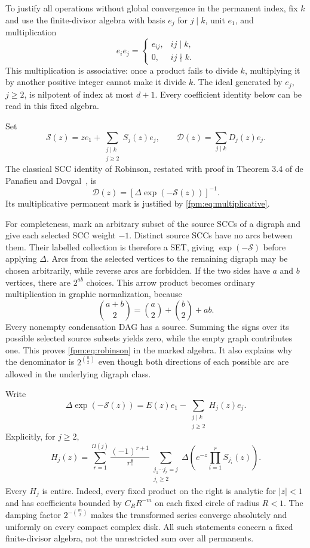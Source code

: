 \documentclass[11pt]{article}
\theoremstyle{definition}\newtheorem{definition}[theorem]{Definition}
\theoremstyle{remark}\newtheorem{remark}[theorem]{Remark}
\begin{document}
To justify all operations without global convergence in the permanent index, fix $k$ and use the finite-divisor algebra with basis $e_j$ for $j\mid k$, unit $e_1$, and multiplication
\[
 e_i e_j=\begin{cases}e_{ij},&ij\mid k,\\0,&ij\nmid k.\end{cases}
\]
This multiplication is associative: once a product fails to divide $k$, multiplying it by another positive integer cannot make it divide $k$. The ideal generated by $e_j$, $j\ge2$, is nilpotent of index at most $d+1$. Every coefficient identity below can be read in this fixed algebra.

Set
\[
 \mathcal S(z)=ze_1+\sum_{\substack{j\mid k\\j\ge2}}S_j(z)e_j,
 \qquad \mathcal D(z)=\sum_{j\mid k}D_j(z)e_j.
\]
The classical SCC identity of Robinson, restated with proof in Theorem 3.4 of de Panafieu and Dovgal~\cite{symbolic}, is
\begin{equation}\label{fpm:eq:robinson}
 \mathcal D(z)=\left[\Delta\exp(-\mathcal S(z))\right]^{-1}.
\end{equation}
Its multiplicative permanent mark is justified by \eqref{fpm:eq:multiplicative}.

For completeness, mark an arbitrary subset of the source SCCs of a digraph and give each selected SCC weight $-1$. Distinct source SCCs have no arcs between them. Their labelled collection is therefore a SET, giving $\exp(-\mathcal S)$ before applying $\Delta$. Arcs from the selected vertices to the remaining digraph may be chosen arbitrarily, while reverse arcs are forbidden. If the two sides have $a$ and $b$ vertices, there are $2^{ab}$ choices. This arrow product becomes ordinary multiplication in graphic normalization, because
\[
 \binom{a+b}{2}=\binom a2+\binom b2+ab.
\]
Every nonempty condensation DAG has a source. Summing the signs over its possible selected source subsets yields zero, while the empty graph contributes one. This proves \eqref{fpm:eq:robinson} in the marked algebra. It also explains why the denominator is $2^{\binom n2}$ even though both directions of each possible arc are allowed in the underlying digraph class.

Write
\begin{equation}\label{fpm:eq:Hdef}
 \Delta\exp(-\mathcal S(z))=E(z)e_1-
 \sum_{\substack{j\mid k\\j\ge2}}H_j(z)e_j.
\end{equation}
Explicitly, for $j\ge2$,
\begin{equation}\label{fpm:eq:Hexplicit}
 H_j(z)=\sum_{r=1}^{\Omega(j)}\frac{(-1)^{r+1}}{r!}
 \sum_{\substack{j_1\cdots j_r=j\\j_i\ge2}}
 \Delta\!\left(e^{-z}\prod_{i=1}^r S_{j_i}(z)\right).
\end{equation}
Every $H_j$ is entire. Indeed, every fixed product on the right is analytic for $|z|<1$ and has coefficients bounded by $C_RR^{-m}$ on each fixed circle of radius $R<1$. The damping factor $2^{-\binom m2}$ makes the transformed series converge absolutely and uniformly on every compact complex disk. All such statements concern a fixed finite-divisor algebra, not the unrestricted sum over all permanents.
\end{document}
